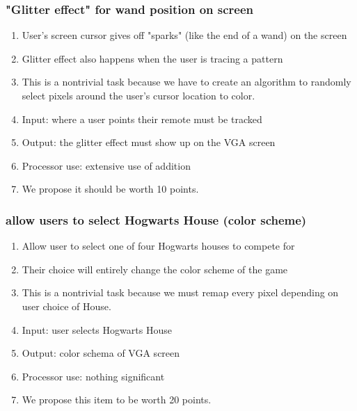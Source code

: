 \documentclass[letterpaper]{article} %
\begin{document}
\subsubsection{"Glitter effect" for wand position on screen}
\begin{enumerate}
    \item User's screen cursor gives off "sparks" (like the end of a wand) on the screen
    \item Glitter effect also happens when the user is tracing a pattern
    \item This is a nontrivial task because we have to create an algorithm to randomly select pixels around the user's cursor location to color.
    \item Input: where a user points their remote must be tracked
    \item Output: the glitter effect must show up on the VGA screen
    \item Processor use: extensive use of addition
    \item We propose it should be worth 10 points.
\end{enumerate}

\subsubsection{allow users to select Hogwarts House (color scheme)}
\begin{enumerate}
    \item Allow user to select one of four Hogwarts houses to compete for
    \item Their choice will entirely change the color scheme of the game
    \item This is a nontrivial task because we must remap every pixel depending on user choice of House.
    \item Input: user selects Hogwarts House
    \item Output: color schema of VGA screen
    \item Processor use: nothing significant
    \item We propose this item to be worth 20 points.
\end{enumerate}
\end{document}
